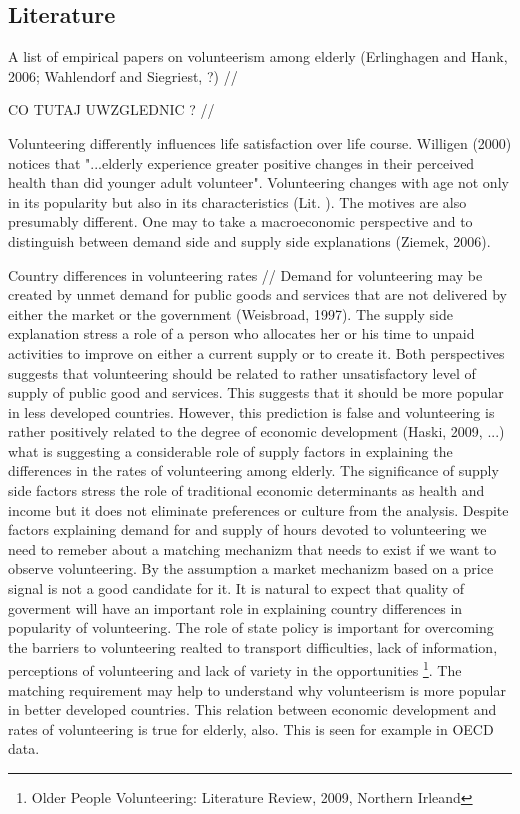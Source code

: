 \documentclass[10pt, letterpaper]{article}
\begin{document}
\begin{spacing}{1.4}
\section{Literature}

A list of empirical papers on volunteerism among elderly (Erlinghagen and Hank, 2006; Wahlendorf and Siegriest, ?) //

CO TUTAJ UWZGLEDNIC ? //

Volunteering differently influences life satisfaction over life course. Willigen (2000) notices that "...elderly experience greater positive changes in their perceived health than did younger adult volunteer". Volunteering changes with age not only in its popularity but also in its characteristics (Lit. ). The motives are also presumably different.  One may to take a  macroeconomic perspective and to distinguish between demand side and supply side explanations (Ziemek, 2006). 

Country differences in volunteering rates //
Demand for volunteering may be created by unmet demand for public goods and services that are not delivered by either the market or the government (Weisbroad, 1997). The supply side explanation stress a role of a person who allocates her or his time to unpaid activities to improve on either a current supply or to create it. Both perspectives  suggests that volunteering should be related to rather unsatisfactory level of supply of public good and services. This suggests that it should be more popular in less developed countries. However, this prediction is false and volunteering is rather positively  related to the degree of economic development (Haski, 2009, ...) what is suggesting a considerable role of supply factors in explaining the differences in the rates of volunteering among elderly. The significance of supply side factors stress the role of traditional economic determinants as health and income but it does not eliminate preferences or culture from the analysis. Despite factors explaining demand for and supply of hours devoted to volunteering  we need to remeber about a matching mechanizm that needs to exist if we want to observe volunteering. By the assumption a market mechanizm based on a price signal is not a good candidate for it. It is natural to expect that quality of goverment will have an important role in explaining country differences in popularity of volunteering. The role of state policy is important for overcoming the barriers to volunteering realted to transport difficulties, lack of information, perceptions of volunteering and lack of variety in the opportunities \footnote{Older People Volunteering: Literature Review, 2009, Northern Irleand}. The matching requirement may help to understand why volunteerism is more popular in better developed countries.  This relation between economic development and rates of volunteering is true for elderly, also.  This is seen for example in OECD data.\\


\end{spacing}
\end{document}
